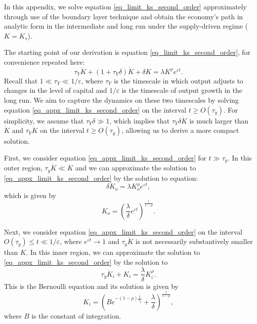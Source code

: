 In this appendix, we solve equation \eqref{eq_limit_ks_second_order} approximately through use of the boundary layer technique and obtain the economy's path in analytic form in the intermediate and long run under the supply-driven regime ($K=K_s$). 

The starting point of our derivation is equation \eqref{eq_limit_ks_second_order}, for convenience repeated here:
\begin{equation}\label{eq_appx_limit_ks_second_order}
    \tau_Y\ddot{K} + (1+\tau_Y\delta)\dot{K} + \delta K = \lambda K^\rho e^{\varepsilon t}.
\end{equation}
Recall that $1\ll\tau_Y\ll1/\varepsilon$, where $\tau_Y$ is the timescale in which output adjusts to changes in the level of capital and $1/\varepsilon$ is the timescale of output growth in the long run. We aim to capture the dynamics on these two timescales by solving equation \eqref{eq_appx_limit_ks_second_order} on the interval $t\geq O(\tau_y)$. For simplicity, we assume that $\tau_Y\delta\gg1$, which implies that $\tau_Y\delta\dot{K}$ is much larger than $\dot{K}$ and $\tau_Y\ddot{K}$ on the interval $t\geq O(\tau_y)$, allowing us to derive a more compact solution.

First, we consider equation \eqref{eq_appx_limit_ks_second_order} for $t\gg\tau_y$. In this outer region, $\tau_y\dot{K}\ll K$ and we can approximate the solution to \eqref{eq_appx_limit_ks_second_order} by the solution to equation:
\begin{equation}
\delta K_o = \lambda K_o^\rho e^{\varepsilon t},
\end{equation}
which is given by
\begin{equation}\label{eq_appx_outer}
    K_o = \left(\frac{\lambda}{\delta}e^{\varepsilon t}\right)^{\frac{1}{1-\rho}}.
\end{equation}

Next, we consider equation \eqref{eq_appx_limit_ks_second_order} on the interval $O(\tau_y)\leq t\ll1/\varepsilon$, where $e^{\varepsilon t}\rightarrow1$ and $\tau_y\dot{K}$ is not necessarily substantively smaller than $K$. In this inner region, we can approximate the solution to \eqref{eq_appx_limit_ks_second_order} by the solution to
\begin{equation}
    \tau_y\dot{K}_i + K_i = \frac{\lambda}{\delta}K^\rho_i.
\end{equation}
This is the Bernoulli equation and its solution is given by 
\begin{equation}\label{eq_appx_inner}
    K_i = \left(B e^{-(1-\rho)\frac{t}{\tau_y}}+\frac{\lambda}{\delta}\right)^{\frac{1}{1-\rho}},
\end{equation}
where $B$ is the constant of integration. 

